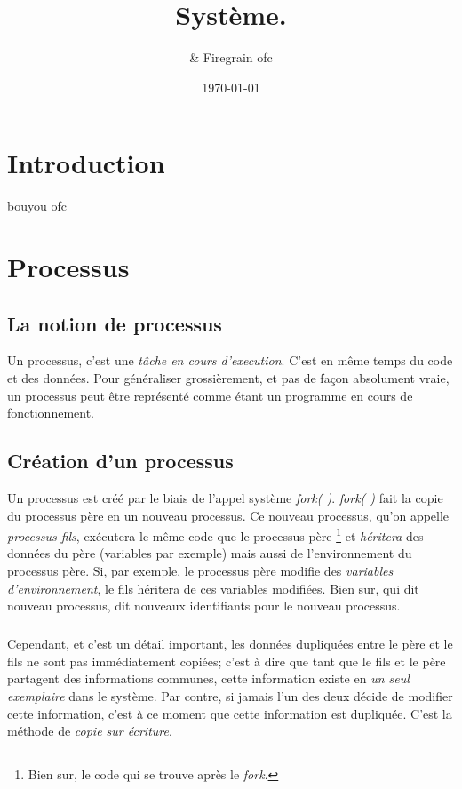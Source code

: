 \documentclass{report}
\title{Système.}
\author{\bsc{McRoss} \& Firegrain ofc}
\date{\today}
\begin{document}
\maketitle{}

\chapter*{Introduction}
bouyou ofc



\chapter{Processus}
\section{La notion de processus}
Un processus, c'est une \emph{tâche en cours d'execution}. C'est en même temps du code et des données. Pour généraliser grossièrement, et pas de façon absolument vraie, un processus peut être représenté comme étant un programme en cours de fonctionnement.

\section{Création d'un processus}
Un processus est créé par le biais de l'appel système \emph{fork( )}. \emph{fork( )} fait la copie du processus père en un nouveau processus. Ce nouveau processus, qu'on appelle \emph{processus fils}, exécutera le même code que le processus père \footnote{Bien sur, le code qui se trouve après le \emph{fork}.} et \emph{héritera} des données du père (variables par exemple) mais aussi de l'environnement du processus père. Si, par exemple, le processus père modifie des \emph{variables d'environnement}, le fils héritera de ces variables modifiées.
Bien sur, qui dit nouveau processus, dit nouveaux identifiants pour le nouveau processus.
\paragraph{}
Cependant, et c'est un détail important, les données dupliquées entre le père et le fils ne sont pas immédiatement copiées; c'est à dire que tant que le fils et le père partagent des informations communes, cette information existe en \emph{un seul exemplaire} dans le système. Par contre, si jamais l'un des deux décide de modifier cette information, c'est à ce moment que cette information est dupliquée. C'est la méthode de \emph{copie sur écriture}.
\end{document}
